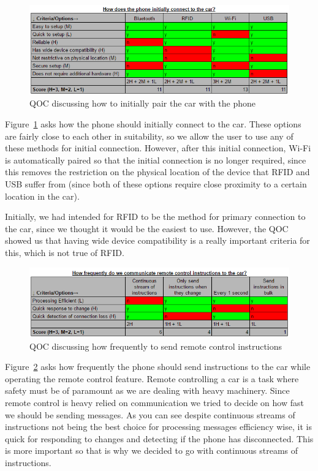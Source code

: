 \documentclass{article}
\begin{document}
\begin{figure}[H]
  \centering
  \includegraphics[scale=0.8]{qoc-app-connect}
  \caption{QOC discussing how to initially pair the car with the phone}\label{qoc-app-connect}
\end{figure}
Figure~\ref{qoc-app-connect} asks how the phone should initially connect to the car. These options are fairly close to each other in suitability, so we allow the user to use any of these methods for initial connection. However, after this initial connection, Wi-Fi is automatically paired so that the initial connection is no longer required, since this removes the restriction on the physical location of the device that RFID and USB suffer from (since both of these options require close proximity to a certain location in the car).

Initially, we had intended for RFID to be the method for primary connection to the car, since we thought it would be the easiest to use. However, the QOC showed us that having wide device compatibility is a really important criteria for this, which is not true of RFID.

\begin{figure}[H]
  \centering
  \includegraphics[scale=0.8]{qoc-app-remote}
  \caption{QOC discussing how frequently to send remote control instructions}\label{qoc-app-remote}
\end{figure}
Figure~\ref{qoc-app-remote} asks how frequently the phone should send instructions to the car while operating the remote control feature. Remote controlling a car is a task where safety must be of paramount as we are dealing with heavy machinery. Since remote control is heavy relied on communication we tried to decide on how fast we should be sending messages. As you can see despite continuous streams of instructions  not being the best choice for processing messages efficiency wise, it is quick for responding to changes and detecting if the phone has disconnected. This is more important so that is why we decided to go with continuous streams of instructions.
\end{document}
